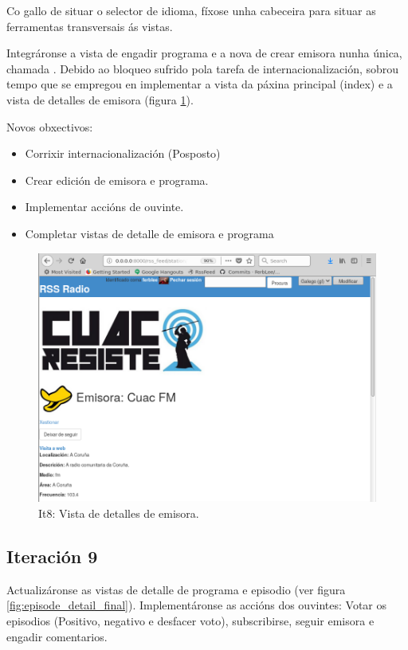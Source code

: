 Co gallo de situar o selector de idioma, fíxose unha cabeceira para situar as ferramentas transversais ás vistas.

Integráronse a vista de engadir programa e a nova de crear emisora nunha única, chamada . Debido ao bloqueo sufrido pola tarefa de internacionalización, sobrou tempo que se empregou en implementar a vista da páxina principal (index) e a vista de detalles de emisora (figura \ref{fig:station_detail_final}).

Novos obxectivos:
\begin{itemize}
	\item Corrixir internacionalización (Posposto)
	\item Crear edición de emisora e programa.
	\item Implementar accións de ouvinte.
	\item Completar vistas de detalle de emisora e programa
\end{itemize}

\begin{figure}[h]
	\centering
	\includegraphics[scale=0.4,keepaspectratio=true]{./images/station_detail_final.png}
	\caption{It8: Vista de detalles de emisora.}
	\label{fig:station_detail_final}
\end{figure}


\subsection{Iteración 9}

Actualizáronse as vistas de detalle de programa e episodio (ver figura \ref{fig:episode_detail_final}). Implementáronse as accións dos ouvintes: Votar os episodios (Positivo, negativo e desfacer voto), subscribirse, seguir emisora e engadir comentarios.

